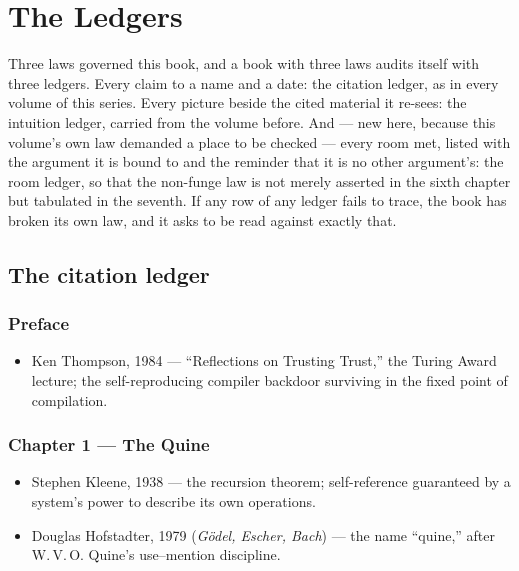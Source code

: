 \chapter{The Ledgers}

Three laws governed this book, and a book with three laws audits itself
with three ledgers. Every claim to a name and a date: the citation
ledger, as in every volume of this series. Every picture beside the cited
material it re-sees: the intuition ledger, carried from the volume
before. And --- new here, because this volume's own law demanded a place
to be checked --- every room met, listed with the argument it is bound
to and the reminder that it is no other argument's: the room ledger, so
that the non-funge law is not merely asserted in the sixth chapter but
tabulated in the seventh. If any row of any ledger fails to trace, the
book has broken its own law, and it asks to be read against exactly that.

\section*{The citation ledger}

\subsection*{Preface}
\begin{itemize}
\item Ken Thompson, 1984 --- ``Reflections on Trusting Trust,'' the Turing
Award lecture; the self-reproducing compiler backdoor surviving in the
fixed point of compilation.
\end{itemize}

\subsection*{Chapter 1 --- The Quine}
\begin{itemize}
\item Stephen Kleene, 1938 --- the recursion theorem; self-reference
guaranteed by a system's power to describe its own operations.
\item Douglas Hofstadter, 1979 (\emph{G\"odel, Escher, Bach}) --- the name
``quine,'' after W.\,V.\,O. Quine's use--mention discipline.
\end{itemize}


